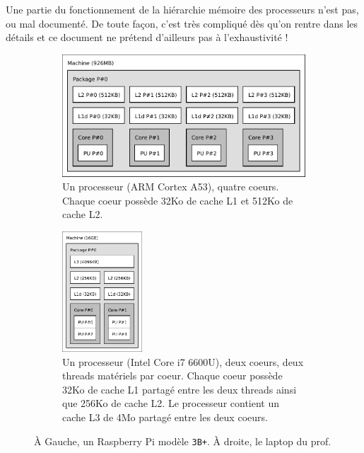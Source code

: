 \begin{danger}
  Une partie du fonctionnement de la hiérarchie mémoire des processeurs n'est
  pas, ou mal documenté. De toute façon, c'est très compliqué dès qu'on rentre
  dans les détails et ce document ne prétend d'ailleurs pas à l'exhaustivité !
\end{danger}

\begin{figure}[htpb]
      \centering
  \begin{subfigure}[t]{0.4\textwidth}
    \centering
    \includegraphics[width=\textwidth]{lstopo_rpi3b.pdf}
    \caption{Un processeur (ARM Cortex A53), quatre coeurs. Chaque coeur possède
      32Ko de cache L1 et 512Ko de cache L2.}
  \end{subfigure}
  \hspace{5mm}
  \begin{subfigure}[t]{0.4\textwidth}
        \centering
    \includegraphics[width=3cm]{lstopo_laptop.pdf}
    \caption{Un processeur (Intel Core i7 6600U), deux coeurs, deux threads
      matériels par coeur. Chaque coeur possède 32Ko de cache L1 partagé entre
      les deux threads ainsi que 256Ko de cache L2. Le processeur contient un
      cache L3 de 4Mo partagé entre les deux coeurs.}
  \end{subfigure}
  \caption{À Gauche, un Raspberry Pi modèle \texttt{3B+}. À droite, le laptop du prof. \label{fig:arch1}}
\end{figure}


